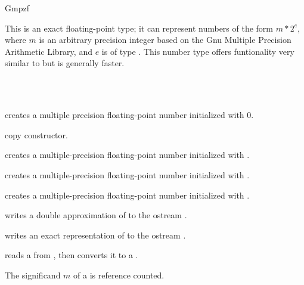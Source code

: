 \begin{ccRefClass} {Gmpzf}
\label{Gmpzf}

\ccDefinition

This is an exact floating-point type; it can represent numbers
of the form $m*2^e$, where $m$ is an arbitrary precision integer 
based on the {\sc Gnu} Multiple Precision Arithmetic Library,
and $e$ is of type . This number type offers funtionality
very similar to  but is generally faster.


\ccIsModel
{}\\
\\

\ccCreation
{}

             {creates a multiple precision floating-point number
               initialized with $0$.}

\ccHidden {}
            {copy constructor.}

            {creates a multiple-precision floating-point number 
              initialized with
             .}

            {creates a multiple-precision floating-point number 
              initialized with
             .}

            {creates a multiple-precision  floating-point number
              initialized with .}
\ccOperations

{writes a double approximation of  to the ostream .}

{writes an exact representation of  to the ostream .}

{reads a  from , then converts it to a .}

\ccImplementation
The significand $m$ of a  is reference counted.

\end{ccRefClass} 
